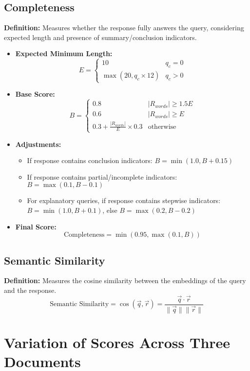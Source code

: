 \subsection{Completeness}
\textbf{Definition:} Measures whether the response fully answers the query, considering expected length and presence of summary/conclusion indicators.
\begin{itemize}
    \item \textbf{Expected Minimum Length:}
    \[
    E = \begin{cases}
        10 & q_c = 0 \\
        \max(20, q_c \times 12) & q_c > 0
    \end{cases}
    \]
    \item \textbf{Base Score:}
    \[
    B =
    \begin{cases}
        0.8 & |R_{words}| \geq 1.5E \\
        0.6 & |R_{words}| \geq E \\
        0.3 + \frac{|R_{words}|}{E} \times 0.3 & \text{otherwise}
    \end{cases}
    \]
    \item \textbf{Adjustments:}
    \begin{itemize}
        \item If response contains conclusion indicators: $B = \min(1.0, B + 0.15)$
        \item If response contains partial/incomplete indicators: $B = \max(0.1, B - 0.1)$
        \item For explanatory queries, if response contains stepwise indicators: $B = \min(1.0, B + 0.1)$, else $B = \max(0.2, B - 0.2)$
    \end{itemize}
    \item \textbf{Final Score:}
    \[
    \text{Completeness} = \min(0.95, \max(0.1, B))
    \]
\end{itemize}

\subsection{Semantic Similarity}
\textbf{Definition:} Measures the cosine similarity between the embeddings of the query and the response.
\[
\text{Semantic Similarity} = \cos(\vec{q}, \vec{r}) = \frac{\vec{q} \cdot \vec{r}}{\|\vec{q}\| \|\vec{r}\|}
\]

\section{Variation of Scores Across Three Documents}

